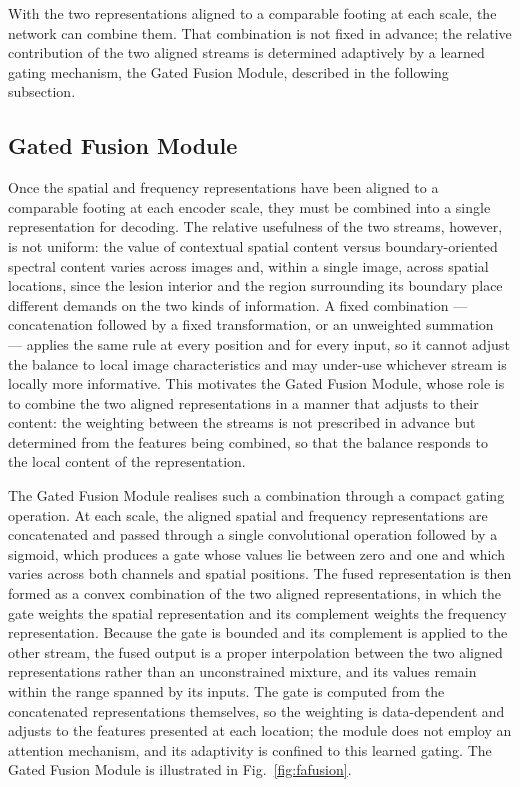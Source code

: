 With the two representations aligned to a comparable footing at each scale, the network can combine them. That combination is not fixed in advance; the relative contribution of the two aligned streams is determined adaptively by a learned gating mechanism, the Gated Fusion Module, described in the following subsection.

\subsection{Gated Fusion Module}

Once the spatial and frequency representations have been aligned to a comparable footing at each encoder scale, they must be combined into a single representation for decoding. The relative usefulness of the two streams, however, is not uniform: the value of contextual spatial content versus boundary-oriented spectral content varies across images and, within a single image, across spatial locations, since the lesion interior and the region surrounding its boundary place different demands on the two kinds of information. A fixed combination --- concatenation followed by a fixed transformation, or an unweighted summation --- applies the same rule at every position and for every input, so it cannot adjust the balance to local image characteristics and may under-use whichever stream is locally more informative. This motivates the Gated Fusion Module, whose role is to combine the two aligned representations in a manner that adjusts to their content: the weighting between the streams is not prescribed in advance but determined from the features being combined, so that the balance responds to the local content of the representation.

The Gated Fusion Module realises such a combination through a compact gating operation. At each scale, the aligned spatial and frequency representations are concatenated and passed through a single convolutional operation followed by a sigmoid, which produces a gate whose values lie between zero and one and which varies across both channels and spatial positions. The fused representation is then formed as a convex combination of the two aligned representations, in which the gate weights the spatial representation and its complement weights the frequency representation. Because the gate is bounded and its complement is applied to the other stream, the fused output is a proper interpolation between the two aligned representations rather than an unconstrained mixture, and its values remain within the range spanned by its inputs. The gate is computed from the concatenated representations themselves, so the weighting is data-dependent and adjusts to the features presented at each location; the module does not employ an attention mechanism, and its adaptivity is confined to this learned gating. The Gated Fusion Module is illustrated in Fig.~\ref{fig:fafusion}.

